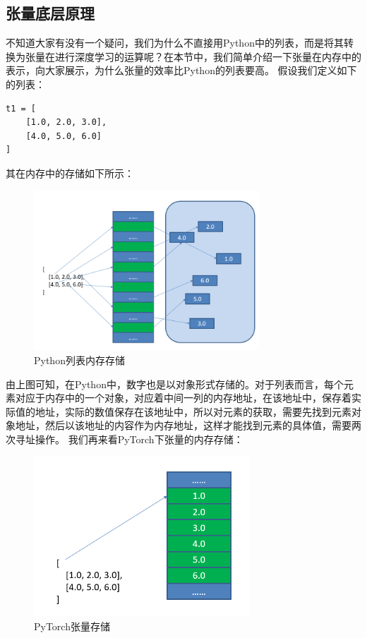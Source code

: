 \documentclass[UTF8]{article}
\begin{document}
\subsection{张量底层原理}
不知道大家有没有一个疑问，我们为什么不直接用Python中的列表，而是将其转换为张量在进行深度学习的运算呢？在本节中，我们简单介绍一下张量在内存中的表示，向大家展示，为什么张量的效率比Python的列表要高。\newline
假设我们定义如下的列表：
\begin{lstlisting}
t1 = [
	[1.0, 2.0, 3.0],
	[4.0, 5.0, 6.0]
]
\end{lstlisting}
其在内存中的存储如下所示：
\begin{figure}[H]
	\caption{Python列表内存存储}
	\label{f000009}
	\centering
	\includegraphics[height=6cm]{images/f000009}
\end{figure}
由上图可知，在Python中，数字也是以对象形式存储的。对于列表而言，每个元素对应于内存中的一个对象，对应着中间一列的内存地址，在该地址中，保存着实际值的地址，实际的数值保存在该地址中，所以对元素的获取，需要先找到元素对象地址，然后以该地址的内容作为内存地址，这样才能找到元素的具体值，需要两次寻址操作。\newline
我们再来看PyTorch下张量的内存存储：
\begin{figure}[H]
	\caption{PyTorch张量存储}
	\label{f000010}
	\centering
	\includegraphics[height=6cm]{images/f000010}
\end{figure}
\end{document}
